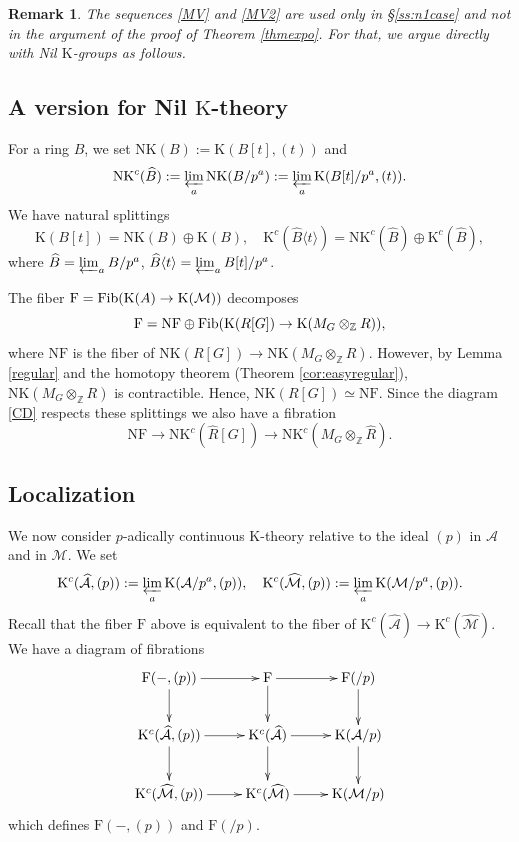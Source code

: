 \documentclass[reqno,11pt,letterpaper]{amsart}
\theoremstyle{plain}
\numberwithin{equation}{subsection}
\newtheorem{Remark}[equation]{Remark}
\theoremstyle{remark}
\theoremstyle{plain}
\theoremstyle{definition}\newtheorem*{notation}{Notation}
\newcommand{\A}{{\mathcal A}}
\newcommand{\M}{{\mathcal M}}
\newcommand{\lan}{\langle}
\newcommand{\ran}{\rangle}
\newcommand{\RK}{\mathrm{K}}
\newcommand{\RF}{\mathrm{F}}
\newcommand{\RNF}{\mathrm{NF}}
\newcommand{\RNK}{\mathrm{NK}}
\newcommand{\BZ}{\mathbb{Z}}
\newcommand{\prolim}{\varprojlim}
\newcommand{\wh}{\widehat}
\begin{document}
\begin{Remark}
{\rm  The sequences \eqref{MV} and \eqref{MV2} are used
only in \S \ref{ss:n1case} and not in the argument of the proof of Theorem \ref{thmexpo}. For that, we argue directly with Nil $\RK$-groups as follows.}
\end{Remark}

 
 \subsection{A version for Nil $\RK$-theory} For a ring $B$, we set $\RNK(B):=\RK(B[t], (t))$ and 
\[
\RNK^c(\wh B):= \prolim_a \RNK( B/ p ^a):=\prolim_a \RK( B[t]/p^a, (t)).
\] 
We have natural splittings
\[
\RK(B[t])=\RNK(B)\oplus \RK(B),\quad \RK^c(\wh B\lan t\ran)=\RNK^c(\wh B)\oplus \RK^c(\wh B),
\]
where $\wh B=\prolim_a B/p^a$, $ \wh B\lan t\ran=\prolim_a B[t]/p^a$. 

The fiber $\RF={\rm Fib}(\RK(A)\to \RK(\M))$ decomposes 
\[
\RF=\RNF\oplus {\rm Fib}(\RK(R[G])\to \RK(M_G\otimes_\BZ R)),
\]
where $\RNF$ is the fiber of $\RNK(R[G])\to \RNK(M_G\otimes_\BZ R)$. However, by Lemma \ref{regular} and  the homotopy theorem (Theorem \ref{cor:easyregular}), $\RNK(M_G\otimes_\BZ R)$ is contractible. Hence, $\RNK(R[G]) \simeq \RNF$. Since the diagram \eqref{CD} respects these splittings we also have a fibration
\begin{equation}\label{nfib1}
\RNF\to   \RNK^c(\wh R[G])\to \RNK^c(M_G\otimes_\BZ \wh R).
\end{equation}
 

\subsection{Localization}
We now consider $p$-adically continuous $\RK$-theory relative to the ideal $(p)$ in $\A$ and in $\M$. We set
\[
\RK^c(\wh \A, (p)):=\prolim_a \RK(\A/p^a, (p)),\quad \RK^c(\wh \M, (p)):=\prolim_a \RK(\M/p^a, (p)).
\]
Recall that the fiber $\RF$ above is equivalent to the fiber of $\RK^c(\wh \A)\to \RK^c(\wh \M)$. We have a diagram of fibrations
 \begin{equation}\label{CDfib1}
\begin{aligned}
\xymatrix{
\RF(-,(p))\ar[r]\ar[d] & \RF\ar[r]\ar[d] & \RF(/p)\ar[d]\\
\RK^c(\wh \A, (p))\ar[r]\ar[d] &\RK^c(\wh \A) \ar[r]\ar[d] & \RK( \A/p)\ar[d]\\
\RK^c(\wh \M, (p)) \ar[r] & \RK^c(\wh \M)\ar[r] & \RK( \M/p)\\
}
\end{aligned}
\end{equation}
which defines $\RF(-, (p))$ and $\RF(/p)$. 
\end{document}
